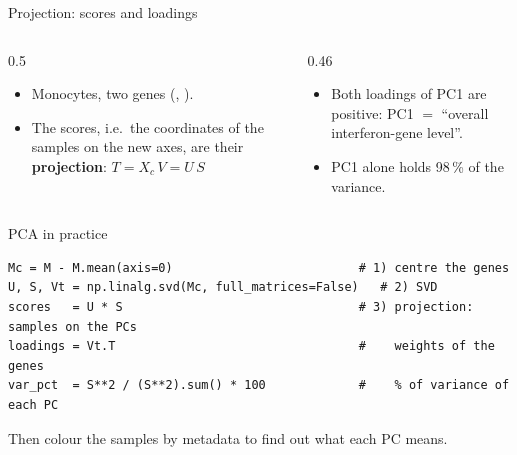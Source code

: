 \begin{frame}{Projection: scores and loadings}
  \centering
  \vspace{0.05cm}
  \begin{columns}[T]
    \begin{column}{0.5\linewidth}\small
      \begin{itemize}\setlength\itemsep{2pt}
        \item Monocytes, two genes (, ).
        \item The \alert{scores}, i.e.\ the coordinates of the samples on the new axes, are their \textbf{projection}: $T=X_c\,V=U\,S$
      \end{itemize}
    \end{column}
    \begin{column}{0.46\linewidth}\small
      \begin{itemize}\setlength\itemsep{2pt}
        \item Both loadings of PC1 are positive: PC1 $=$ ``overall interferon-gene level''.
        \item PC1 alone holds \alert{98\,\%} of the variance.
      \end{itemize}
    \end{column}
  \end{columns}
\end{frame}

\begin{frame}[fragile]{PCA in practice}
  \centering
  \vspace{0.25cm}

\begin{lstlisting}
Mc = M - M.mean(axis=0)                          # 1) centre the genes
U, S, Vt = np.linalg.svd(Mc, full_matrices=False)   # 2) SVD
scores   = U * S                                 # 3) projection: samples on the PCs
loadings = Vt.T                                  #    weights of the genes
var_pct  = S**2 / (S**2).sum() * 100             #    % of variance of each PC
\end{lstlisting}
  \vspace{0.1cm}
  \small
  Then \alert{colour the samples} by metadata to find out what each PC means.
\end{frame}

